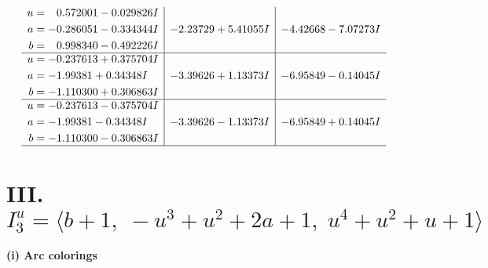 \documentclass[1p]{elsarticle_modified}
\theoremstyle{definition}
\begin{document}
$$\begin{array}{c|c|c}
\begin{aligned}
u &= \phantom{-}0.572001 - 0.029826 I \\
a &= -0.286051 - 0.334344 I \\
b &= \phantom{-}0.998340 - 0.492226 I\end{aligned}
 & -2.23729 + 5.41055 I & -4.42668 - 7.07273 I \\ \hline\begin{aligned}
u &= -0.237613 + 0.375704 I \\
a &= -1.99381 + 0.34348 I \\
b &= -1.110300 + 0.306863 I\end{aligned}
 & -3.39626 + 1.13373 I & -6.95849 - 0.14045 I \\ \hline\begin{aligned}
u &= -0.237613 - 0.375704 I \\
a &= -1.99381 - 0.34348 I \\
b &= -1.110300 - 0.306863 I\end{aligned}
 & -3.39626 - 1.13373 I & -6.95849 + 0.14045 I\\
 \hline 
 \end{array}$$\newpage\newpage\renewcommand{\arraystretch}{1}
\centering \section*{III. $I^u_{3}= \langle b+1,\;- u^3+u^2+2 a+1,\;u^4+u^2+u+1 \rangle$}
\flushleft \textbf{(i) Arc colorings}\\
\end{document}
